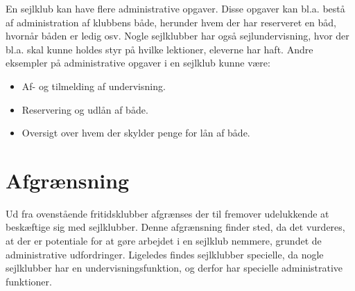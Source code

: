 En sejlklub kan have flere administrative opgaver. 
Disse opgaver kan bl.a. bestå af administration af klubbens både, herunder hvem der har reserveret en båd, hvornår båden er ledig osv.
Nogle sejlklubber har også sejlundervisning, hvor der bl.a. skal kunne holdes styr på hvilke lektioner, eleverne har haft. 
Andre eksempler på administrative opgaver i en sejlklub kunne være:

\begin{itemize}
  \item Af- og tilmelding af undervisning.
  \item Reservering og udlån af både.
  \item Oversigt over hvem der skylder penge for lån af både.
\end{itemize}

\section{Afgrænsning}

Ud fra ovenstående fritidsklubber afgrænses der til fremover udelukkende at beskæftige sig med sejlklubber. 
Denne afgrænsning finder sted, da det vurderes, at der er potentiale for at gøre arbejdet i en sejlklub nemmere, grundet de administrative udfordringer.
Ligeledes findes sejlklubber specielle, da nogle sejlklubber har en undervisningsfunktion, og derfor har specielle administrative funktioner.
